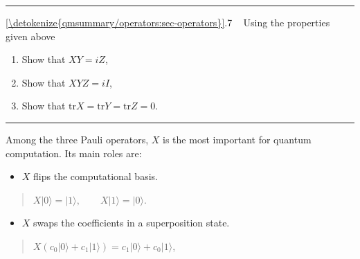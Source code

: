 \documentclass[letterpaper,10pt,english]{jupyterBook}
\begin{document}
\bigskip\hrule\bigskip


\sphinxAtStartPar
{} \hyperref[\detokenize{qmsummary/operators:sec-operators}]{\ref{\detokenize{qmsummary/operators:sec-operators}}}.7     Using the properties given above
\begin{enumerate}
%
\item {}
\sphinxAtStartPar
Show that \(X Y = i Z\),

\item {}
\sphinxAtStartPar
Show that \(XYZ = i I\),

\item {}
\sphinxAtStartPar
Show that \(\text{tr} X = \text{tr} Y = \text{tr} Z = 0\).

\end{enumerate}


\bigskip\hrule\bigskip


\sphinxAtStartPar
Among the three Pauli operators, \(X\) is the most important for quantum computation. Its main roles are:
\begin{itemize}
\item {}
\sphinxAtStartPar
\(X\) flips the computational basis.

\end{itemize}
\begin{quote}

\sphinxAtStartPar
\(X |0\rangle = |1\rangle, \qquad X |1\rangle = |0\rangle\).
\end{quote}
\begin{itemize}
\item {}
\sphinxAtStartPar
\(X\) swaps the coefficients in a superposition state.

\end{itemize}
\begin{quote}

\sphinxAtStartPar
\(X \left(c_0|0\rangle + c_1 |1\rangle\right) = c_1|0\rangle + c_0 |1\rangle\),
\end{quote}
\end{document}
